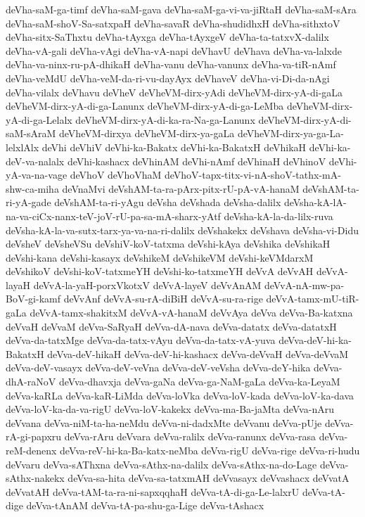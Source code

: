 {deVha-saM-ga-timf
deVha-saM-gava
deVha-saM-ga-vi-va-jiRtaH
deVha-saM-sAra
deVha-saM-shoV-Sa-satxpaH
deVha-savaR
deVha-shudidhxH
deVha-sithxtoV
deVha-sitx-SaThxtu
deVha-tAyxga
deVha-tAyxgeV
deVha-ta-tatxvX-dalilx
deVha-vA-gali
deVha-vAgi
deVha-vA-napi
deVhavU
deVhava
deVha-va-lalxde
deVha-va-ninx-ru-pA-dhikaH
deVha-vanu
deVha-vanunx
deVha-va-tiR-nAmf
deVha-veMdU
deVha-veM-da-ri-vu-dayAyx
deVhaveV
deVha-vi-Di-da-nAgi
deVha-vilalx
deVhavu
deVheV
deVheVM-dirx-yAdi
deVheVM-dirx-yA-di-gaLa
deVheVM-dirx-yA-di-ga-Lanunx
deVheVM-dirx-yA-di-ga-LeMba
deVheVM-dirx-yA-di-ga-Lelalx
deVheVM-dirx-yA-di-ka-ra-Na-ga-Lanunx
deVheVM-dirx-yA-di-saM-sAraM
deVheVM-dirxya
deVheVM-dirx-ya-gaLa
deVheVM-dirx-ya-ga-La-lelxlAlx
deVhi
deVhiV
deVhi-ka-Bakatx
deVhi-ka-BakatxH
deVhikaH
deVhi-ka-deV-va-nalalx
deVhi-kashacx
deVhinAM
deVhi-nAmf
deVhinaH
deVhinoV
deVhi-yA-va-na-vage
deVhoV
deVhoVhaM
deVhoV-tapx-titx-vi-nA-shoV-tathx-mA-shw-ca-miha
deVnaMvi
deVshAM-ta-ra-pArx-pitx-rU-pA-vA-hanaM
deVshAM-ta-ri-yA-gade
deVshAM-ta-ri-yAgu
deVsha
deVshada
deVsha-dalilx
deVsha-kA-lA-na-va-ciCx-nanx-teV-joV-rU-pa-sa-mA-sharx-yAtf
deVsha-kA-la-da-lilx-ruva
deVsha-kA-la-va-sutx-tarx-ya-va-na-ri-dalilx
deVshakekx
deVshava
deVsha-vi-Didu
deVsheV
deVsheVSu
deVshiV-koV-tatxma
deVshi-kAya
deVshika
deVshikaH
deVshi-kana
deVshi-kasayx
deVshikeM
deVshikeVM
deVshi-keVMdarxM
deVshikoV
deVshi-koV-tatxmeYH
deVshi-ko-tatxmeYH
deVvA
deVvAH
deVvA-layaH
deVvA-la-yaH-porxVkotxV
deVvA-layeV
deVvAnAM
deVvA-nA-mw-pa-BoV-gi-kamf
deVvAnf
deVvA-su-rA-diBiH
deVvA-su-ra-rige
deVvA-tamx-mU-tiR-gaLa
deVvA-tamx-shakitxM
deVvA-vA-hanaM
deVvAya
deVva
deVva-Ba-katxna
deVvaH
deVvaM
deVva-SaRyaH
deVva-dA-nava
deVva-datatx
deVva-datatxH
deVva-da-tatxMge
deVva-da-tatx-vAyu
deVva-da-tatx-vA-yuva
deVva-deV-hi-ka-BakatxH
deVva-deV-hikaH
deVva-deV-hi-kashacx
deVva-deVvaH
deVva-deVvaM
deVva-deV-vasayx
deVva-deV-veVna
deVva-deV-veVsha
deVva-deY-hika
deVva-dhA-raNoV
deVva-dhavxja
deVva-gaNa
deVva-ga-NaM-gaLa
deVva-ka-LeyaM
deVva-kaRLa
deVva-kaR-LiMda
deVva-loVka
deVva-loV-kada
deVva-loV-ka-dava
deVva-loV-ka-da-va-rigU
deVva-loV-kakekx
deVva-ma-Ba-jaMta
deVva-nAru
deVvana
deVva-niM-ta-ha-neMdu
deVva-ni-dadxMte
deVvanu
deVva-pUje
deVva-rA-gi-papxru
deVva-rAru
deVvara
deVva-ralilx
deVva-ranunx
deVva-rasa
deVva-reM-denenx
deVva-reV-hi-ka-Ba-katx-neMba
deVva-rigU
deVva-rige
deVva-ri-hudu
deVvaru
deVva-sAThxna
deVva-sAthx-na-dalilx
deVva-sAthx-na-do-Lage
deVva-sAthx-nakekx
deVva-sa-hita
deVva-sa-tatxmAH
deVvasayx
deVvashacx
deVvatA
deVvatAH
deVva-tAM-ta-ra-ni-sapxqqhaH
deVva-tA-di-ga-Le-lalxrU
deVva-tA-dige
deVva-tAnAM
deVva-tA-pa-shu-ga-Lige
deVva-tAshacx
}
